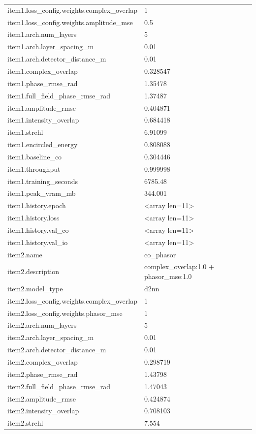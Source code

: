 \begin{longtable}{p{}p{}}
item1.loss\_config.weights.complex\_overlap & 1\\
item1.loss\_config.weights.amplitude\_mse & 0.5\\
item1.arch.num\_layers & 5\\
item1.arch.layer\_spacing\_m & 0.01\\
item1.arch.detector\_distance\_m & 0.01\\
item1.complex\_overlap & 0.328547\\
item1.phase\_rmse\_rad & 1.35478\\
item1.full\_field\_phase\_rmse\_rad & 1.37487\\
item1.amplitude\_rmse & 0.404871\\
item1.intensity\_overlap & 0.684418\\
item1.strehl & 6.91099\\
item1.encircled\_energy & 0.808088\\
item1.baseline\_co & 0.304446\\
item1.throughput & 0.999998\\
item1.training\_seconds & 6785.48\\
item1.peak\_vram\_mb & 344.001\\
item1.history.epoch & <array len=11>\\
item1.history.loss & <array len=11>\\
item1.history.val\_co & <array len=11>\\
item1.history.val\_io & <array len=11>\\
item2.name & co\_phasor\\
item2.description & complex\_overlap:1.0 + phasor\_mse:1.0\\
item2.model\_type & d2nn\\
item2.loss\_config.weights.complex\_overlap & 1\\
item2.loss\_config.weights.phasor\_mse & 1\\
item2.arch.num\_layers & 5\\
item2.arch.layer\_spacing\_m & 0.01\\
item2.arch.detector\_distance\_m & 0.01\\
item2.complex\_overlap & 0.298719\\
item2.phase\_rmse\_rad & 1.43798\\
item2.full\_field\_phase\_rmse\_rad & 1.47043\\
item2.amplitude\_rmse & 0.424874\\
item2.intensity\_overlap & 0.708103\\
item2.strehl & 7.554\\

\end{longtable}
